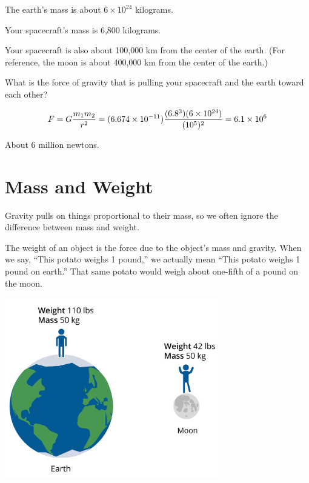 \begin{Exercise}[title={Gravity}, label=gravity_earth]

  The earth's mass is about $6 \times 10^{24}$ kilograms.

  Your spacecraft's mass is 6,800 kilograms.

  Your spacecraft is also about 100,000 km from the center of the earth. (For reference, the moon is about 400,000 km from the center of the earth.)

  What is the force of gravity that is pulling your spacecraft and the earth toward each other?

\end{Exercise}
\begin{Answer}[ref=gravity_earth]

  $$F = G\frac{m_1 m_2}{r^2} = (6.674 \times 10^{-11})\frac{(6.8 \time 10^3)(6 \times 10^{24})}{(10^5)^2} = 6.1 \times 10^{6}$$

  About 6 million newtons.

\end{Answer}

\section{Mass and Weight}

Gravity pulls on things proportional to their mass, so we often
ignore the difference between mass and weight.

The weight of an object is the force due to the object's mass and
gravity. When we say, ``This potato weighs 1 pound,'' we actually mean
``This potato weighs 1 pound on earth.'' That same potato would weigh
about one-fifth of a pound on the moon.

\includegraphics[width=0.7\textwidth]{massvweight.png}

